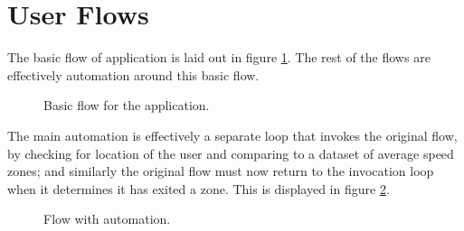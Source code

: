 \documentclass[11pt, a4paper, notitlepage]{report}
\begin{document}
\section{User Flows}
The basic flow of application is laid out in figure \ref{fig:BasFlow}. The rest of the flows are effectively automation around this basic flow.
\begin{figure}
    \centering
    \caption{Basic flow for the application.}
    \label{fig:BasFlow}
\end{figure}

The main automation is effectively a separate loop that invokes the original flow, by checking for location of the user and comparing to a dataset of average speed zones; and similarly the original flow must now return to the invocation loop when it determines it has exited a zone. This is displayed in figure \ref{fig:AutoFlow}.
\begin{figure}
    \centering
    \caption{Flow with automation.}
    \label{fig:AutoFlow}
\end{figure}
\end{document}
